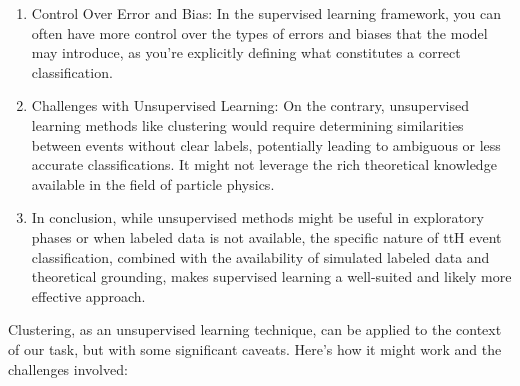 \begin{enumerate}
      \item Control Over Error and Bias: In the supervised learning framework, you can often have more control over the
            types of errors and biases that the model may introduce, as you're explicitly defining what constitutes a
            correct classification.

      \item Challenges with Unsupervised Learning: On the contrary, unsupervised learning methods like clustering would
            require determining similarities between events without clear labels, potentially leading to ambiguous or less
            accurate classifications. It might not leverage the rich theoretical knowledge available in the field of
            particle physics.

      \item In conclusion, while unsupervised methods might be useful in exploratory phases or when labeled data is not
            available, the specific nature of ttH event classification, combined with the availability of simulated
            labeled data and theoretical grounding, makes supervised learning a well-suited and likely more effective
            approach.
\end{enumerate}

Clustering, as an unsupervised learning technique, can be applied to the context of our task, but with some significant
caveats. Here's how it might work and the challenges involved:

